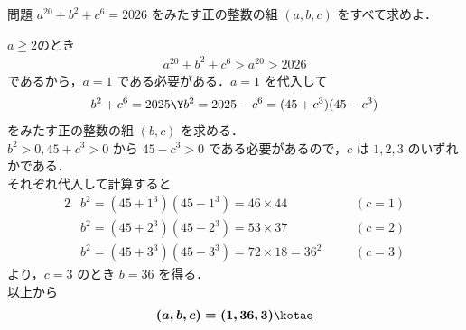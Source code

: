 \documentclass[fleqn]{ltjsarticle}
\begin{document}

\begin{problembox}{問題}
  $a^{20}+b^{2}+c^{6}=2026$ をみたす正の整数の組 $(a, b, c)$ をすべて求めよ．

\end{problembox}

\noindent
\kaib\quad
$a\geqq 2$のとき
\begin{align*}
    a^{20}+b^{2}+c^{6}>a^{20}>2026
\end{align*}
であるから，$a=1$ である必要がある．$a=1$ を代入して
\begin{align*}
    b^{2}+c^{6}=2025 \Y b^{2}=2025-c^{6}=(45+c^{3})(45-c^{3})
\end{align*}
をみたす正の整数の組 $(b, c)$ を求める． \\
$b^{2}>0, 45+c^{3}>0$ から $45-c^{3}>0$ である必要があるので，$c$ は $1, 2, 3$ のいずれかである． \\
それぞれ代入して計算すると
\begin{alignat*}{2}
    & b^{2}=(45+1^{3})(45-1^{3})=46\times 44 & & (c=1) \\
    & b^{2}=(45+2^{3})(45-2^{3})=53\times 37 & & (c=2) \\
    & b^{2}=(45+3^{3})(45-3^{3})=72\times 18=36^{2} & \quad & (c=3)
\end{alignat*}
より，$c=3$ のとき $b=36$ を得る． \\
以上から
\begin{align*}
    \boldsymbol{(a, b, c)=(1, 36, 3)}\kotae
\end{align*}

\end{document}
